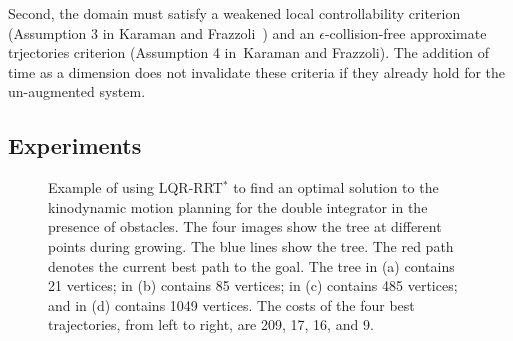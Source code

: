 \documentclass[letterpaper, 10pt, english, conference]{IEEEtran}
\begin{document}
 Second, the domain must satisfy a weakened local
controllability criterion 
(Assumption 3 in Karaman and Frazzoli~\cite{Karaman.Frazzoli:CDC10}) and
an $\epsilon$-collision-free approximate trjectories criterion
(Assumption 4 in~Karaman and Frazzoli\cite{Karaman.Frazzoli:CDC10}). 
The addition of time as a dimension does not invalidate these
criteria if they already hold for the un-augmented system.

\subsection{Experiments}

\begin{figure}
\begin{center}
  \begin{center}
  \end{center}
\end{center}
\caption{Example of using LQR-RRT$^*$ to find an optimal solution to
  the kinodynamic motion planning for the double integrator in the
  presence of obstacles. The four images show the tree at different
  points during growing. The blue lines show the tree. The red path
  denotes the current best path to the goal. The tree in (a) contains
  21 vertices; in (b) contains 85 vertices; in (c) contains 485
  vertices; and in (d) contains 1049 vertices. The costs of the four
  best trajectories, from left to right, are 209, 17, 16, and 9.}
\label{fig:linear_case_study}
\end{figure}
\end{document}
